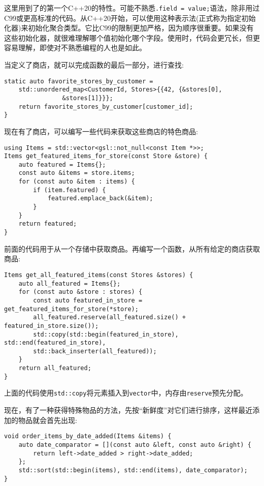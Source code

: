 这里用到了的第一个C++20的特性。可能不熟悉\texttt{.field = value;}语法，除非用过C99或更高标准的代码。从C++20开始，可以使用这种表示法(正式称为指定初始化器)来初始化聚合类型。它比C99的限制更加严格，因为顺序很重要。如果没有这些初始化器，就很难理解哪个值初始化哪个字段。使用时，代码会更冗长，但更容易理解，即使对不熟悉编程的人也是如此。

当定义了商店，就可以完成函数的最后一部分，进行查找:

\begin{lstlisting}[style=styleCXX]
	static auto favorite_stores_by_customer =
	std::unordered_map<CustomerId, Stores>{{42, {&stores[0],
				&stores[1]}}};
	return favorite_stores_by_customer[customer_id];
}
\end{lstlisting}

现在有了商店，可以编写一些代码来获取这些商店的特色商品:

\begin{lstlisting}[style=styleCXX]
using Items = std::vector<gsl::not_null<const Item *>>;
Items get_featured_items_for_store(const Store &store) {
	auto featured = Items{};
	const auto &items = store.items;
	for (const auto &item : items) {
		if (item.featured) {
			featured.emplace_back(&item);
		}
	}
	return featured;
}
\end{lstlisting}

前面的代码用于从一个存储中获取商品。再编写一个函数，从所有给定的商店获取商品:

\begin{lstlisting}[style=styleCXX]
Items get_all_featured_items(const Stores &stores) {
	auto all_featured = Items{};
	for (const auto &store : stores) {
		const auto featured_in_store = get_featured_items_for_store(*store);
		all_featured.reserve(all_featured.size() + featured_in_store.size());
		std::copy(std::begin(featured_in_store), std::end(featured_in_store),
		std::back_inserter(all_featured));
	}
	return all_featured;
}
\end{lstlisting}

上面的代码使用\texttt{std::copy}将元素插入到\texttt{vector}中，内存由\texttt{reserve}预先分配。

现在，有了一种获得特殊物品的方法，先按“新鲜度”对它们进行排序，这样最近添加的物品就会首先出现:

\begin{lstlisting}[style=styleCXX]
void order_items_by_date_added(Items &items) {
	auto date_comparator = [](const auto &left, const auto &right) {
		return left->date_added > right->date_added;
	};
	std::sort(std::begin(items), std::end(items), date_comparator);
}
\end{lstlisting}

